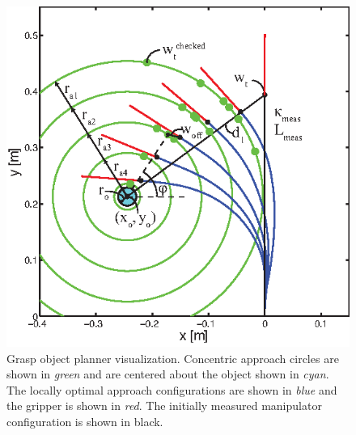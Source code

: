 \begin{figure}[htpb]
\centering
   \includegraphics[width=0.85\columnwidth, trim = 0mm 0mm 5mm 5mm, clip]{Figures/processing_control/grasp_object_planner.eps}
   \caption{Grasp object planner visualization. Concentric approach circles are shown in \emph{green} and are centered about the object shown in \emph{cyan}. The locally optimal approach configurations are shown in \emph{blue} and the gripper is shown in \emph{red}. The initially measured manipulator configuration is shown in black.}
   \label{fig:planGrasp}
\end{figure}

